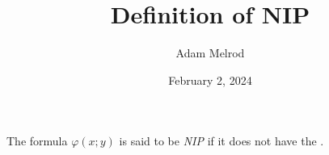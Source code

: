 \documentclass[a4paper]{article}
\title{Definition of NIP}
\date{February 2, 2024}
\author{Adam Melrod}
\begin{document}
\maketitle
\par{The formula \(\varphi (x;y)\) is said to be \emph{NIP} if it does not have
the .}
\printbibliography
\end{document}
